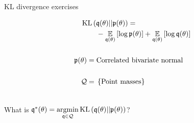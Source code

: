 \begin{frame}{KL divergence exercises}
\hspace{-3em}
\begin{minipage}{0.5\textwidth}
%
\begin{align*}
%
\MoveEqLeft
\kl{\q(\theta)}{\p(\theta)} ={}\\&
-\expect{\q(\theta)}{\log \p(\theta)} +
\expect{\q(\theta)}{\log \q(\theta)}\\ \\
\p(\theta) ={}& \textrm{Correlated bivariate normal}\\ \\
\qdom ={}& \left\{ \textrm{Point masses}\right\}\\ \\
%
\end{align*}

What is $\mathfrak{q}^*(\theta) ={} \underset{\mathfrak{q} \in \mathcal{Q}}{\mathrm{argmin}}\, \mathrm{KL}\left(\mathfrak{q}(\theta) || \mathfrak{p}(\theta) \right)$?
%
\end{minipage}
%
\begin{minipage}{0.4\textwidth}

\end{minipage}


\end{frame}





